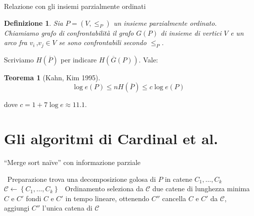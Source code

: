 \documentclass[10pt]{beamer}
\newtheorem{teorema}{Teorema}
\newtheorem{definizione}{Definizione}
\begin{document}
\begin{frame}
  {Relazione con gli insiemi parzialmente ordinati}
  \begin{definizione}
    Sia \(P = (V, \le_P)\) un insieme parzialmente ordinato. Chiamiamo 
    \emph{grafo di confrontabilità} il grafo \(G(P)\) di insieme di vertici 
    \(V\) e un arco fra \(v_i\,\text{,}v_j\in V\) se sono confrontabili 
    secondo \(\le_P\).
  \end{definizione}
  \vspace{3mm}
  Scriviamo \(H(\overline{P})\) per indicare \(H(\overline{G}(P))\). Vale:
  \vspace{3mm}
  \begin{teorema}[Kahn, Kim 1995]
    \[
      \log{e(P)}\le nH(\overline{P})\le c\log{e(P)}
    \]
  \end{teorema}
  dove \(c = 1 + 7\log{e}\approx 11.1\).
\end{frame}

\section{Gli algoritmi di Cardinal et al.}
\begin{frame}
  {``Merge sort na\"ive'' con informazione parziale}
  \begin{algorithm}[H]
    \caption{``Merge sort na\"ive'' con informazione parziale} 
    \begin{algorithmic}[1] 
      \STATE \, \COMMENT Preparazione 
      \STATE trova una decomposizione golosa di \(P\) in catene \(C_1,\dots,C_k\) 
      \STATE \(\mathcal{C}\leftarrow\left\{C_1,\dots,C_k\right\}\) 
      \STATE \, \COMMENT Ordinamento 
        \STATE seleziona da \(\mathcal{C}\) due catene di lunghezza minima \(C\) e \(C'\) 
        \STATE fondi \(C\) e \(C'\) in tempo lineare, ottenendo \(C''\) 
        \STATE cancella \(C\) e \(C'\) da \(\mathcal{C}\), aggiungi \(C''\)   
      \ENDWHILE 
      \RETURN l'unica catena di \(\mathcal{C}\) 
    \end{algorithmic}
  \end{algorithm}
\end{frame}
\end{document}
